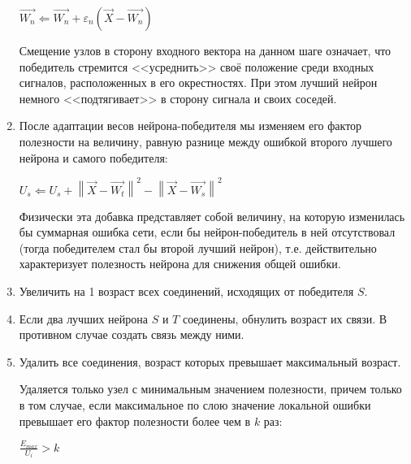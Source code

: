 \documentclass[unicode, 12pt, a4paper,oneside,fleqn]{article}
\begin{document}
\begin{enumerate}
  $\vec{W_n} \Leftarrow \vec{W_n}+\varepsilon_n(\vec{X}-\vec{W_n})$

  Смещение узлов в сторону входного вектора на данном шаге означает,
  что победитель стремится <<усреднить>> своё положение среди входных
  сигналов, расположенных в его окрестностях. При этом лучший нейрон
  немного <<подтягивает>> в сторону сигнала и своих соседей.

\item \label{gng-u:8} %
  После адаптации весов нейрона-победителя мы изменяем его фактор
  полезности на величину, равную разнице между ошибкой второго лучшего
  нейрона и самого победителя:

  $U_{s} \Leftarrow U_{s} + \left\|\vec{X}-\vec{W_t}\right\|^{2} -
                            \left\|\vec{X}-\vec{W_s}\right\|^{2}$

  Физически эта добавка представляет собой величину, на которую
  изменилась бы суммарная ошибка сети, если бы нейрон-победитель в ней
  отсутствовал (тогда победителем стал бы второй лучший нейрон),
  т.е. действительно характеризует полезность нейрона для снижения
  общей ошибки.

\item \label{gng-u:9} \label{gng:8}
  Увеличить на 1 возраст всех соединений, исходящих от победителя $S$.

\item \label{gng-u:10} \label{gng:9}
  Если два лучших нейрона $S$ и $T$ соединены, обнулить возраст их
  связи. В противном случае создать связь между ними.


\item \label{gng-u:11} %
  Удалить все соединения, возраст которых превышает максимальный
  возраст.

  Удаляется только узел с минимальным значением полезности, причем
  только в том случае, если максимальное по слою значение локальной
  ошибки превышает его фактор полезности более чем в $k$ раз:

  $\frac{E_{max}}{U_i} > k$

\end{enumerate}
\end{document}
